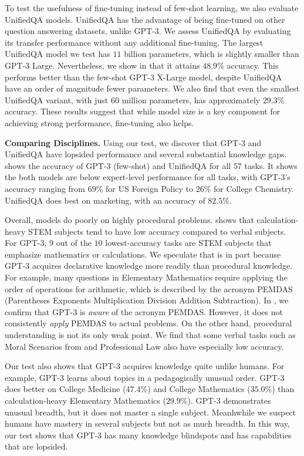 To test the usefulness of fine-tuning instead of few-shot learning, we also evaluate UnifiedQA models. 
UnifiedQA has the advantage of being fine-tuned on other question answering datasets, unlike GPT-3. We assess UnifiedQA 
by evaluating its transfer performance without any additional fine-tuning. The largest UnifiedQA model we test has $11$ billion parameters, which is slightly smaller than GPT-3 Large. Nevertheless, we show in  that it attains $48.9\%$ accuracy. This performs better than the few-shot GPT-3 X-Large model, despite UnifiedQA have an order of magnitude fewer parameters. We also find that even the smallest UnifiedQA variant, with just $60$ million parameters, has approximately $29.3\%$ accuracy.
These results suggest that while model size is a key component for achieving strong performance, fine-tuning also helps.%

\noindent\textbf{Comparing Disciplines.}\quad
Using our test, we discover that GPT-3 and UnifiedQA have lopsided performance and several substantial knowledge gaps.  shows the accuracy of GPT-3 (few-shot) and UnifiedQA for all $57$ tasks. It shows the both models are below expert-level performance for all tasks, with GPT-3's accuracy ranging from $69\%$ for US Foreign Policy to $26\%$ for College Chemistry. UnifiedQA does best on marketing, with an accuracy of $82.5\%$.

Overall, models do poorly on highly procedural problems.
 shows that calculation-heavy STEM subjects tend to have low accuracy compared to verbal subjects.
For GPT-3, $9$ out of the $10$ lowest-accuracy tasks are STEM subjects that emphasize mathematics or calculations.
We speculate that is in part because GPT-3 acquires declarative knowledge more readily than procedural knowledge. For example, many questions in Elementary Mathematics require applying the order of operations for arithmetic, which is described by the acronym PEMDAS (Parentheses Exponents Multiplication Division Addition Subtraction). In , we confirm that GPT-3 is \emph{aware} of the acronym PEMDAS. However, it does not consistently \emph{apply} PEMDAS to actual problems. 
On the other hand, procedural understanding is not its only weak point. We find that some verbal tasks such as Moral Scenarios from \cite{hendrycks2020ethicsdataset} and Professional Law also have especially low accuracy.

Our test also shows that GPT-3 acquires knowledge quite unlike humans. For example, GPT-3 learns about topics in a pedagogically unusual order.
GPT-3 does better on College Medicine ($47.4\%$) and College Mathematics ($35.0\%$) than calculation-heavy Elementary Mathematics ($29.9\%$). GPT-3 demonstrates unusual breadth, but it does not master a single subject. Meanhwhile we suspect humans have mastery in several subjects but not as much breadth. In this way, our test shows that GPT-3 has many knowledge blindspots and has capabilities that are lopsided.

